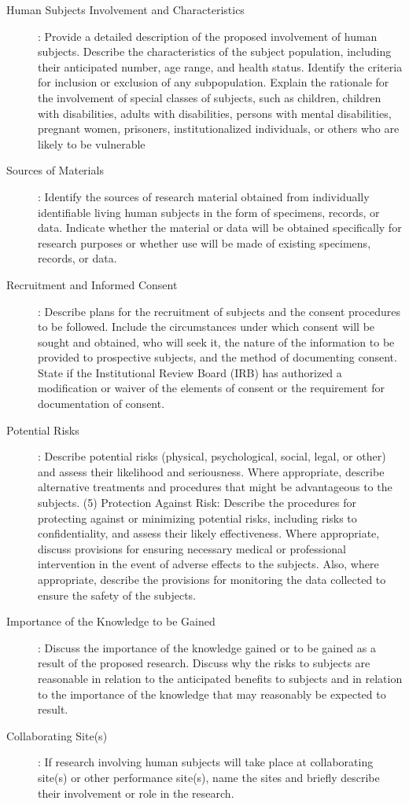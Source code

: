 \begin{description}
\item[ Human Subjects Involvement and Characteristics]: Provide a detailed description of the proposed involvement of human subjects. Describe the characteristics of the subject population, including their anticipated number, age range, and health status. Identify the criteria for inclusion or exclusion of any subpopulation. Explain the rationale for the involvement of special classes of subjects, such as children, children with disabilities, adults with disabilities, persons with mental disabilities, pregnant women, prisoners, institutionalized individuals, or others who are likely to be vulnerable
\item[Sources of Materials]: Identify the sources of research material obtained from individually identifiable living human subjects in the form of specimens, records, or data. Indicate whether the material or data will be obtained specifically for research purposes or whether use will be made of existing specimens, records, or data.
\item[Recruitment and Informed Consent]: Describe plans for the recruitment of subjects and the consent procedures to be followed. Include the circumstances under which consent will be sought and obtained, who will seek it, the nature of the information to be provided to prospective subjects, and the method of documenting consent. State if the Institutional Review Board (IRB) has authorized a modification or waiver of the elements of consent or the requirement for documentation of consent.
\item[ Potential Risks]: Describe potential risks (physical, psychological, social, legal, or other) and assess their likelihood and seriousness. Where appropriate, describe alternative treatments and procedures that might be advantageous to the subjects.
(5) Protection Against Risk: Describe the procedures for protecting against or minimizing potential risks, including risks to confidentiality, and assess their likely effectiveness. Where
appropriate, discuss provisions for ensuring necessary medical or professional intervention in the event of adverse effects to the subjects. Also, where appropriate, describe the provisions for monitoring the data collected to ensure the safety of the subjects.
\item[ Importance of the Knowledge to be Gained]: Discuss the importance of the knowledge gained or to be gained as a result of the proposed research. Discuss why the risks to subjects are reasonable in relation to the anticipated benefits to subjects and in relation to the importance of the knowledge that may reasonably be expected to result.
\item[Collaborating Site(s)]: If research involving human subjects will take place at collaborating site(s) or other performance site(s), name the sites and briefly describe their involvement or role in the research.

\end{description}